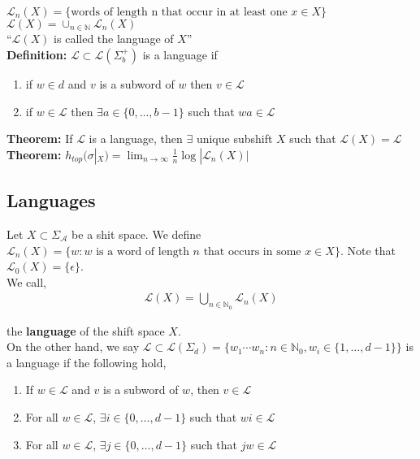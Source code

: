 \documentclass[12pt]{article}
\begin{document}
$\mathcal{L}_n(X) = \{\text{words of length n that occur in at least one } x \in X\}$\\

$\mathcal{L}(X) = \cup_{n \in \mathbb{N}} \mathcal{L}_n(X)$\\

``$\mathcal{L}(X)$ is called the language of $X$''\\

\textbf{Definition:} $\mathcal{L} \subset \mathcal{L}(\Sigma_b^+)$ is a language if
\begin{enumerate}[label=(\alph*)]

\item if $w \in d$ and $v$ is a subword of $w$ then $v \in \mathcal{L}$

\item if $w \in \mathcal{L}$ then $\exists a \in \{0, \ldots, b-1\}$ such that $wa \in \mathcal{L}$

\end{enumerate}

\textbf{Theorem:} If $\mathcal{L}$ is a language, then $\exists$ unique subshift $X$ such that $\mathcal{L}(X) = \mathcal{L}$\\

\textbf{Theorem:} $h_{top}(\sigma|_X) = \lim_{n \to \infty} \frac{1}{n} \log | \mathcal{L}_n(X)|$

\subsection{Languages}

Let $X \subset \Sigma_{\mathcal{A}}$ be a shit space. We define $\mathcal{L}_n(X) = \{w : w \text{ is a word of length } n \text{ that occurs in some } x \in X\}$. Note that $\mathcal{L}_0(X) = \{\epsilon\}$. \\

We call,
\begin{align*}
\mathcal{L}(X) = \bigcup_{n \in \mathbb{N}_0} \mathcal{L}_n(X)
\end{align*}

the \textbf{language} of the shift space $X$.\\

On the other hand, we say $\mathcal{L} \subset \mathcal{L}(\Sigma_{d}) = \{w_1 \cdots w_n : n \in \mathbb{N}_0, w_i \in \{1, \ldots, d-1\}\}$ is a language if the following hold,
\begin{enumerate}
\item If $w \in \mathcal{L}$ and $v$ is a subword of $w$, then $v \in \mathcal{L}$

\item For all $w \in \mathcal{L}$, $\exists i \in \{0, \ldots, d-1\}$ such that $wi \in \mathcal{L}$

\item For all $w \in \mathcal{L}$, $\exists j \in \{0, \ldots, d-1\}$ such that $jw \in \mathcal{L}$
\end{enumerate}
\end{document}
